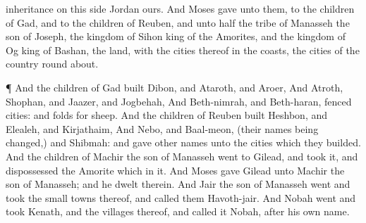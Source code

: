 {inheritance on this
side
Jordan
{} ours.
And
Moses
gave unto them,
{} to the
children of
Gad, and to the
children of
Reuben, and unto
half the
tribe of
Manasseh the
son of
Joseph, the
kingdom of
Sihon
king of the
Amorites, and the
kingdom of
Og
king of
Bashan, the
land, with the
cities thereof in the
coasts,
{} the
cities of the
country round
about.
\par }{\PP {}¶ And the
children of
Gad
built
Dibon, and
Ataroth, and
Aroer,
And Atroth,
Shophan, and
Jaazer, and
Jogbehah,
And
Beth-nimrah, and
Beth-haran,
fenced
cities: and
folds for
sheep.
And the
children of
Reuben
built
Heshbon, and
Elealeh, and
Kirjathaim,
And
Nebo, and
Baal-meon, (their
names being
changed,) and
Shibmah: and
gave other
names unto the
cities which they
builded.
And the
children of
Machir the
son of
Manasseh
went to
Gilead, and
took it, and
dispossessed the
Amorite which
{} in it.
And
Moses
gave
Gilead unto
Machir the
son of
Manasseh; and he
dwelt therein.
And
Jair the
son of
Manasseh
went and
took the small
towns thereof, and
called them
Havoth-jair.
And
Nobah
went and
took
Kenath, and the
villages thereof, and
called it
Nobah, after his own
name.

}
